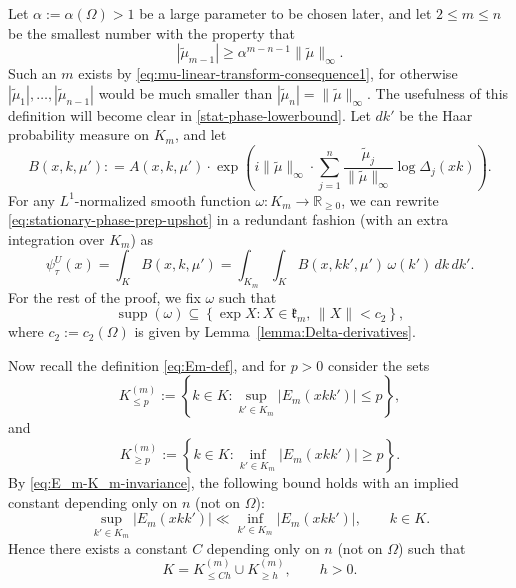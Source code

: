 \documentclass[11pt,oneside]{amsart}
\numberwithin{equation}{section}
\theoremstyle{remark}
\theoremstyle{plain}
\DeclareMathOperator{\supp}{supp}
\newcommand\RR{\mathbb{R}}
\newcommand\mfk{\mathfrak{k}}
\renewcommand\leq{\leqslant}
\renewcommand\geq{\geqslant}
\begin{document}
Let $\alpha:=\alpha(\Omega)>1$ be a large parameter to be chosen later, and let $2\leq m\leq n$ be the smallest number with the property that
\begin{equation}\label{eq:m-choice}
|\tilde{\mu}_{m-1}|\geq \alpha^{m-n-1}\|\tilde{\mu}\|_{\infty}.
\end{equation}
Such an $m$ exists by \eqref{eq:mu-linear-transform-consequence1}, for otherwise $|\tilde\mu_1|,\dotsc,|\tilde\mu_{n-1}|$ would be much smaller than $|\tilde\mu_n|=\|\tilde{\mu}\|_{\infty}$. The usefulness of this definition will become clear in \eqref{stat-phase-lowerbound}. Let $dk'$ be the Haar probability measure on $K_m$, and let
\[ B(x,k,\mu'): = A(x,k,\mu') \cdot \exp\left(i\|\tilde{\mu}\|_{\infty}\cdot \sum_{j=1}^n \frac{\tilde{\mu}_j}{\|\tilde{\mu}\|_{\infty}} \log \Delta_j(xk)\right).\]
For any $L^1$-normalized smooth function $\omega:K_m\to\RR_{\geq 0}$, we can rewrite \eqref{eq:stationary-phase-prep-upshot} in a redundant fashion (with an extra integration over $K_m$) as
\begin{equation}\label{eq:psi-integral-Q_m-K_m}
\psi_\tau^{U}(x)=\int_K B(x,k,\mu')=\int_{K_m}\int_{K} B(x,kk',\mu')\,\omega(k')\,dk\,dk'.
\end{equation}
For the rest of the proof, we fix $\omega$ such that
\[
\supp(\omega)\subseteq\left\{\exp X: X\in\mfk_m,\,\|X\|<c_2\right\},
\]
where $c_2:=c_2(\Omega)$ is given by Lemma~\ref{lemma:Delta-derivatives}.

Now recall the definition \eqref{eq:Em-def}, and for $p>0$ consider the sets
\[
K^{(m)}_{\leq p}:= \left\{k\in K:\sup_{k'\in K_{m}}|E_{m}(xkk')|\leq p\right\},
\]
and
\[
K^{(m)}_{\geq p}:=\left \{k\in K:\inf_{k'\in K_{m}}|E_{m}(xkk')|\geq p\right\}.
\] 
By \eqref{eq:E_m-K_m-invariance}, the following bound holds with an implied constant depending only on $n$ (not on $\Omega$):
\[
\sup_{k'\in K_{m}}|E_{m}(xkk')| \ll \inf_{k'\in K_{m}}|E_{m}(xkk')|,\qquad k\in K.
\]
Hence there exists a constant $C$ 
depending only on $n$ (not on $\Omega$) such that 
\begin{equation}\label{eq:Q_m-union}
K=K^{(m)}_{\leq Ch} \cup K^{(m)}_{\geq h}, \qquad h>0.
\end{equation}
\end{document}
